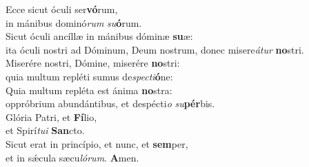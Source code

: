 \evenverse Ecce sicut óculi ser\textbf{vó}rum,~\*\\
\evenverse in mánibus dominó\textit{rum} \textit{su}\textbf{ó}rum.\\
\oddverse Sicut óculi ancíllæ in mánibus dóminæ \textbf{su}æ:~\*\\
\oddverse ita óculi nostri ad Dóminum, Deum nostrum, donec misere\textit{á}\textit{tur} \textbf{no}stri.\\
\evenverse Miserére nostri, Dómine, miserére \textbf{no}stri:~\*\\
\evenverse quia multum repléti sumus de\textit{spe}\textit{cti}\textbf{ó}ne:\\
\oddverse Quia multum repléta est ánima \textbf{no}stra:~\*\\
\oddverse oppróbrium abundántibus, et despécti\textit{o} \textit{su}\textbf{pér}bis.\\
\evenverse Glória Patri, et \textbf{Fí}lio,~\*\\
\evenverse et Spirí\textit{tu}\textit{i} \textbf{San}cto.\\
\oddverse Sicut erat in princípio, et nunc, et \textbf{sem}per,~\*\\
\oddverse et in sǽcula sæcu\textit{ló}\textit{rum}. \textbf{A}men.\\
